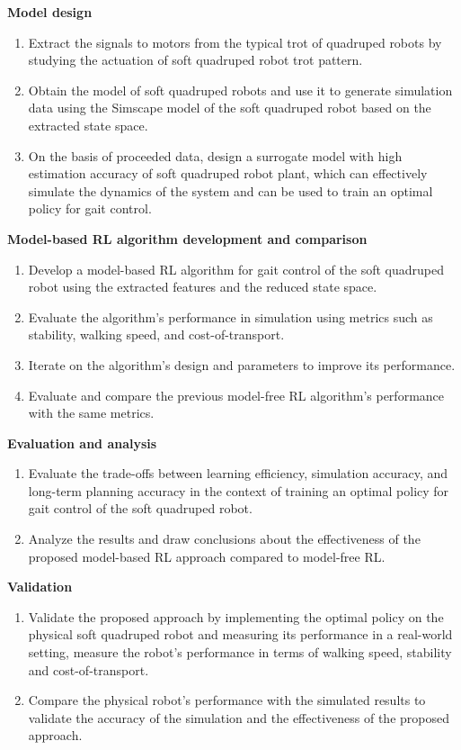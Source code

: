 \textbf{Model design}
\begin{enumerate}
    \item Extract the signals to motors from the typical trot of quadruped robots by studying the actuation of soft quadruped robot trot pattern.
    \item Obtain the model of soft quadruped robots and use it to generate simulation data using the Simscape model of the soft quadruped robot based on the extracted state space. 
    \item On the basis of proceeded data, design a surrogate model with high estimation accuracy of soft quadruped robot plant, which can effectively simulate the dynamics of the system and can be used to train an optimal policy for gait control. 
\end{enumerate}
\textbf{Model-based \ac{RL} algorithm development and comparison}
\begin{enumerate}
    \item Develop a model-based \ac{RL} algorithm for gait control of the soft quadruped robot using the extracted features and the reduced state space.
    \item Evaluate the algorithm's performance in simulation using metrics such as stability, walking speed, and cost-of-transport.
    \item Iterate on the algorithm's design and parameters to improve its performance.
    \item Evaluate and compare the previous model-free \ac{RL} algorithm's performance with the same metrics.
\end{enumerate}
\textbf{Evaluation and analysis}
\begin{enumerate}
    \item Evaluate the trade-offs between learning efficiency, simulation accuracy, and long-term planning accuracy in the context of training an optimal policy for gait control of the soft quadruped robot.
    \item Analyze the results and draw conclusions about the effectiveness of the proposed model-based \ac{RL} approach compared to model-free \ac{RL}.
\end{enumerate}
\textbf{Validation}
\begin{enumerate}
    \item Validate the proposed approach by implementing the optimal policy on the physical soft quadruped robot and measuring its performance in a real-world setting, measure the robot's performance in terms of walking speed, stability and cost-of-transport.
    \item Compare the physical robot's performance with the simulated results to validate the accuracy of the simulation and the effectiveness of the proposed approach.
\end{enumerate}
